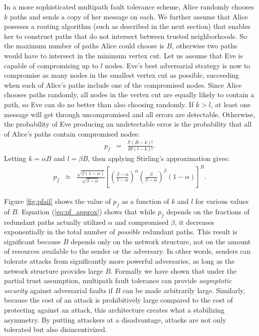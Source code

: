 \documentclass{sig-alternate-05-2015}
\newcommand{\beq}{\begin{eqnarray}}
\newcommand{\eeq}{\end{eqnarray}}
\begin{document}
In a more sophisticated multipath fault tolerance scheme,
Alice randomly chooses $k$ paths and sends a copy of
her message on each.
We further assume that Alice posesses a routing algorithm
(such as described in the next section)
that enables her to construct paths that
do not intersect between trusted neighborhoods.
So the maximum number of paths Alice could choose is $B$,
otherwise two paths would have to intersect in the minimum vertex cut.
Let us assume that Eve is capable of compromising up to $l$ nodes.
Eve's best adversarial strategy is now to compromise as many nodes in the smallest
vertex cut as possible,
succeeding when each of Alice's paths include one of the compromised nodes.
Since Alice chooses paths randomly,
all nodes in the vertex cut are equally likely to contain a path,
so Eve can do no better than also choosing randomly.
If $k > l$, at least one message will get through uncompromised and all
errors are detectable.
Otherwise, the probability of Eve producing an undetectable error is
the probability that all of Alice's paths contain compromised nodes:
\beq
\label{eq:pf}
p_f &=& \frac{l!(B-k)!}{B!(l-k)!}.
\eeq
Letting $k=\alpha B$ and $l=\beta B$, then applying Stirling's
approximation gives:
\begin{eqnarray}
\label{eq:pf_approx}
p_f &\approx&
\frac{\sqrt{\beta(1-\alpha)}}{\sqrt{\beta-\alpha}}
\left[
    \left( \frac{\beta-\alpha}{1-\alpha} \right)^{\alpha}
    \left( \frac{\beta}{\beta-\alpha} \right)^{\beta}
    (1-\alpha)
\right]^B.
\end{eqnarray}

Figure \ref{fig:pfail} shows the value of $p_f$
as a function of $k$ and $l$ for various values of $B$.
Equation (\ref{eq:pf_approx}) shows that while $p_f$
depends on the fractions of
redundant paths actually utilized $\alpha$ and compromised $\beta$,
it decreases exponentially in the total number of {\em possible}
redundant paths.
This result is significant because $B$ depends only on the network structure,
not on the amount of resources available to the sender or the adversary.
In other words, senders can tolerate attacks from significantly more powerful
adversaries, as long as the network structure provides large $B$.
Formally we have shown that under the partial trust assumption,
multipath fault tolerance can provide {\em asymptotic security}
against adversarial faults if $B$ can be made arbitrarily large.
Similarly, because the cost of an attack is prohibitively large
compared to the cost of protecting against an attack,
this architecture creates what a stabilizing asymmetry.
By putting attackers at a disadvantage, attacks are not only tolerated
but also disincentivized.
\end{document}
